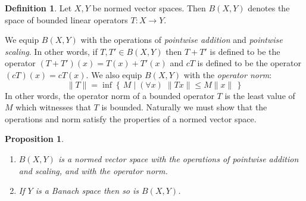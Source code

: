 \documentclass[11pt,oneside]{amsbook}
\newcommand{\set}[1]{\left\{\,#1\,\right\}}
\theoremstyle{definition}
\theoremstyle{plain}
\newtheorem{prop}[thm]{Proposition}
\theoremstyle{definition}
\newtheorem{defn}[thm]{Definition}
\theoremstyle{remark}
\numberwithin{equation}{section}
\numberwithin{figure}{section}
\begin{document}
\begin{defn}
  Let $X,Y$ be normed vector spaces. Then $B(X,Y)$ denotes the space of bounded linear operators $T\colon X\to Y$.
\end{defn}

We equip $B(X,Y)$ with the operations of \emph{pointwise addition} and \emph{pointwise scaling}. In other words, if $T,T'\in B(X,Y)$ then $T+T'$ is defined to be the operator $(T+T')(x)=T(x)+T'(x)$ and $cT$ is defined to be the operator $(cT)(x)=cT(x)$. We also equip $B(X,Y)$ with the \emph{operator norm}:
\[\|T\|=\inf\set{M\mid(\forall x)\;\|Tx\|\leq M\|x\|}
\]
In other words, the operator norm of a bounded operator $T$ is the least value of $M$ which witnesses that $T$ is bounded. Naturally we must show that the operations and norm satisfy the properties of a normed vector space.

\begin{prop}
  \begin{enumerate}
  \item $B(X,Y)$ is a normed vector space with the operations of pointwise addition and scaling, and with the operator norm.
  \item If $Y$ is a Banach space then so is $B(X,Y)$.
  \end{enumerate}
\end{prop}
\end{document}
